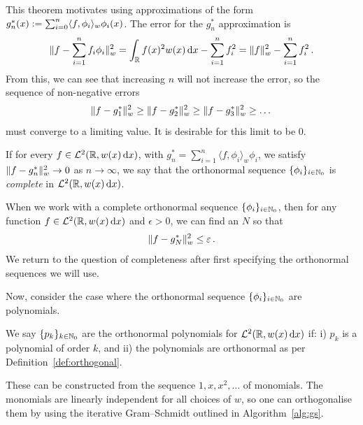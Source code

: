 This theorem motivates using approximations of the form $g_n^*(x) := \sum_{i=0}^n \langle f, \phi_i \rangle_w \phi_i(x)$. The error for the $g_n^*$ approximation is
\begin{equation*} \label{ortho_error}
\lVert f - \sum_{i=1}^n f_i \phi_i\rVert_w^2 = \int_{\mathbb{R}} f(x)^2 w(x) \mathop{}\!\mathrm{d} x - \sum_{i=1}^n f_i^2 = \lVert f\rVert_w^2 - \sum_{i=1}^n f_i^2 \,.
\end{equation*}
From this, we can see that increasing $n$ will not increase the error, so the sequence of non-negative errors
\begin{equation*} \label{error_sequence}
\lVert f - g_1^*\rVert_w^2 \ge \lVert f - g_2^*\rVert_w^2 \ge \lVert f - g_3^*\rVert_w^2 \ge  \dots
\end{equation*}
must converge to a limiting value. It is desirable for this limit to be 0.

\begin{definition}
If for every $f \in \mathcal{L}^2(\mathbb{R}, w(x) \mathop{}\!\mathrm{d} x)$, with $g_n^* = \sum_{i=1}^n \langle f, \phi_i \rangle_w \phi_i$, we satisfy $\lVert f - g_n^*\rVert_w^2 \to 0$ as $n \to \infty$, we say that the orthonormal sequence $\{ \phi_i \}_{i \in \mathbb{N}_0}$ is \emph{complete} in $\mathcal{L}^2(\mathbb{R}, w(x) \mathop{}\!\mathrm{d} x)$.
\end{definition}

When we work with a complete orthonormal sequence $\{ \phi_i \}_{i \in \mathbb{N}_0}$, then for any function $f \in \mathcal{L}^2(\mathbb{R}, w(x) \mathop{}\!\mathrm{d} x)$ and $\epsilon > 0$, we can find an $N$ so that
\[ \lVert  f - g_N^* \rVert_w^2 \le \varepsilon \,. \]
We return to the question of completeness after first specifying the orthonormal sequences we will use.

Now, consider the case where the orthonormal sequence $\{ \phi_i \}_{i \in \mathbb{N}_0}$ are polynomials.

\begin{definition}
We say $\{ p_k \}_{k\in\mathbb{N}_0}$ are the orthonormal polynomials for $\mathcal{L}^2(\mathbb{R}, w(x) \mathop{}\!\mathrm{d} x)$ if: i) $p_k$ is a polynomial of order $k$, and ii) the polynomials are orthonormal as per Definition~\ref{def:orthogonal}.
\end{definition}

These can be constructed from the sequence $1, x, x^2, \dots$ of monomials. The monomials are linearly independent for all choices of $w$, so one can orthogonalise them by using the iterative Gram--Schmidt outlined in Algorithm~\ref{alg:gs}.

